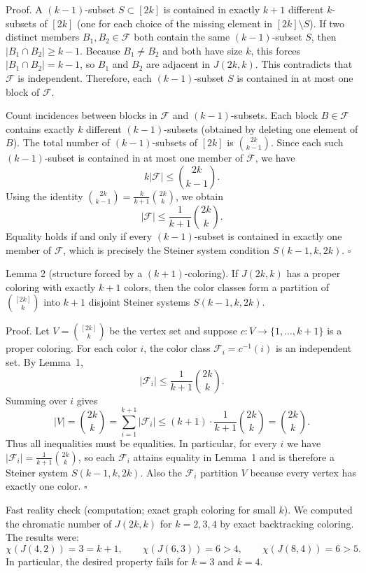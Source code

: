 Proof.
A $(k-1)$-subset $S\subset[2k]$ is contained in exactly $k+1$ different $k$-subsets of $[2k]$ (one for each choice of the missing element in $[2k]\setminus S$).
If two distinct members $B_1,B_2\in\mathcal{F}$ both contain the same $(k-1)$-subset $S$, then $|B_1\cap B_2|\ge k-1$.
Because $B_1\ne B_2$ and both have size $k$, this forces $|B_1\cap B_2|=k-1$, so $B_1$ and $B_2$ are adjacent in $J(2k,k)$.
This contradicts that $\mathcal{F}$ is independent.
Therefore, each $(k-1)$-subset $S$ is contained in at most one block of $\mathcal{F}$.

Count incidences between blocks in $\mathcal{F}$ and $(k-1)$-subsets.
Each block $B\in\mathcal{F}$ contains exactly $k$ different $(k-1)$-subsets (obtained by deleting one element of $B$).
The total number of $(k-1)$-subsets of $[2k]$ is $\binom{2k}{k-1}$.
Since each such $(k-1)$-subset is contained in at most one member of $\mathcal{F}$, we have
\[
 k|\mathcal{F}|\le \binom{2k}{k-1}.
\]
Using the identity $\binom{2k}{k-1}=\frac{k}{k+1}\binom{2k}{k}$, we obtain
\[
 |\mathcal{F}|\le \frac{1}{k+1}\binom{2k}{k}.
\]
Equality holds if and only if every $(k-1)$-subset is contained in exactly one member of $\mathcal{F}$, which is precisely the Steiner system condition $S(k-1,k,2k)$.
$\square$

Lemma 2 (structure forced by a $(k+1)$-coloring).
If $J(2k,k)$ has a proper coloring with exactly $k+1$ colors, then the color classes form a partition of $\binom{[2k]}{k}$ into $k+1$ disjoint Steiner systems $S(k-1,k,2k)$.

Proof.
Let $V=\binom{[2k]}{k}$ be the vertex set and suppose $c:V\to\{1,\dots,k+1\}$ is a proper coloring.
For each color $i$, the color class $\mathcal{F}_i=c^{-1}(i)$ is an independent set.
By Lemma~1,
\[
|\mathcal{F}_i|\le \frac{1}{k+1}\binom{2k}{k}.
\]
Summing over $i$ gives
\[
|V|=\binom{2k}{k}=\sum_{i=1}^{k+1} |\mathcal{F}_i|\le (k+1)\cdot \frac{1}{k+1}\binom{2k}{k}=\binom{2k}{k}.
\]
Thus all inequalities must be equalities.
In particular, for every $i$ we have $|\mathcal{F}_i|=\frac{1}{k+1}\binom{2k}{k}$, so each $\mathcal{F}_i$ attains equality in Lemma~1 and is therefore a Steiner system $S(k-1,k,2k)$.
Also the $\mathcal{F}_i$ partition $V$ because every vertex has exactly one color.
$\square$

Fast reality check (computation; exact graph coloring for small $k$).
We computed the chromatic number of $J(2k,k)$ for $k=2,3,4$ by exact backtracking coloring.
The results were:
\[
\chi(J(4,2))=3=k+1,\qquad \chi(J(6,3))=6>4,\qquad \chi(J(8,4))=6>5.
\]
In particular, the desired property fails for $k=3$ and $k=4$.

